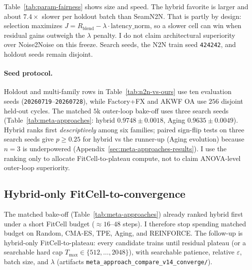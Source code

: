 Table~\ref{tab:param-fairness} shows size and speed.
The hybrid favorite is larger and about $7.4\times$ slower per holdout batch than SeamN2N.
That is partly by design: selection maximizes $J=R_{\mathrm{blend}}-\lambda\cdot\mathrm{latency\_norm}$,
so a slower cell can win when residual gains outweigh the $\lambda$ penalty.
I do not claim architectural superiority over Noise2Noise on this freeze.
Search seeds, the N2N train seed \texttt{424242}, and holdout seeds remain disjoint.

\paragraph{Seed protocol.}
Holdout and multi-family rows in Table~\ref{tab:n2n-vs-ours} use ten evaluation seeds (\texttt{20260719}--\texttt{20260728}), while Factory+FX and AKWF OA use $256$ disjoint held-out cycles.
The matched $5$k outer-loop bake-off uses three search seeds
(Table~\ref{tab:meta-approaches}: hybrid $0.9748{\pm}0.0018$, Aging $0.9635{\pm}0.0049$).
Hybrid ranks first \emph{descriptively} among six families; paired sign-flip tests on three search seeds give $p{\ge}0.25$ for hybrid vs the runner-up (Aging evolution) because $n{=}3$ is underpowered (Appendix~\ref{sec:meta-approaches-results}).
I use the ranking only to allocate FitCell-to-plateau compute, not to claim ANOVA-level outer-loop superiority.

\subsection{Hybrid-only FitCell-to-convergence}
\label{sec:v14-converge}
\label{sec:v14-hybrid-converge}

The matched bake-off (Table~\ref{tab:meta-approaches}) already ranked hybrid first under a short FitCell budget (${\approx}16$--$48$ steps).
I therefore stop spending matched budget on Random, CMA-ES, TPE, Aging, and REINFORCE.
The follow-up is hybrid-only FitCell-to-plateau: every candidate trains until residual plateau
(or a searchable hard cap $T_{\max}\!\in\!\{512,\ldots,2048\}$),
with searchable patience, relative $\varepsilon$, batch size, and $\lambda$
(artifacts \texttt{meta\_approach\_compare\_v14\_converge/}).

